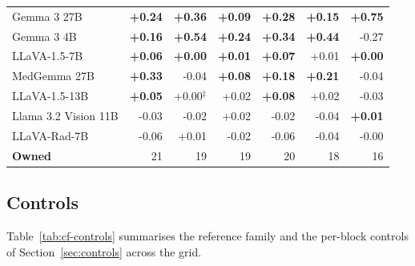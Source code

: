 \documentclass{article}
\begin{document}
\begin{table}[htbp]
{\begin{tabular}{lrrrrrr}
Gemma 3 27B & \cellcolor{cfTerra3}\textbf{+0.24} & \cellcolor{cfTerra4}\textbf{+0.36} & \cellcolor{cfTerra2}\textbf{+0.09} & \cellcolor{cfTerra4}\textbf{+0.28} & \cellcolor{cfTerra3}\textbf{+0.15} & \cellcolor{cfTerra4}\textbf{+0.75} \\
Gemma 3 4B & \cellcolor{cfTerra3}\textbf{+0.16} & \cellcolor{cfTerra4}\textbf{+0.54} & \cellcolor{cfTerra3}\textbf{+0.24} & \cellcolor{cfTerra4}\textbf{+0.34} & \cellcolor{cfTerra4}\textbf{+0.44} & \cellcolor{cfSlate4}-0.27 \\
LLaVA-1.5-7B & \cellcolor{cfTerra2}\textbf{+0.06} & \cellcolor{cfTerra1}\textbf{+0.00} & \cellcolor{cfTerra1}\textbf{+0.01} & \cellcolor{cfTerra2}\textbf{+0.07} & \cellcolor{cfTerra1}+0.01 & \cellcolor{cfTerra1}\textbf{+0.00} \\
MedGemma 27B & \cellcolor{cfTerra4}\textbf{+0.33} & \cellcolor{cfSlate2}-0.04 & \cellcolor{cfTerra2}\textbf{+0.08} & \cellcolor{cfTerra3}\textbf{+0.18} & \cellcolor{cfTerra3}\textbf{+0.21} & \cellcolor{cfSlate2}-0.04 \\
LLaVA-1.5-13B & \cellcolor{cfTerra2}\textbf{+0.05} & \cellcolor{cfTerra1}+0.00$^{\ddagger}$ & \cellcolor{cfTerra1}+0.02 & \cellcolor{cfTerra2}\textbf{+0.08} & \cellcolor{cfTerra1}+0.02 & \cellcolor{cfSlate2}-0.03 \\
Llama 3.2 Vision 11B & \cellcolor{cfSlate2}-0.03 & \cellcolor{cfSlate2}-0.02 & \cellcolor{cfTerra2}+0.02 & \cellcolor{cfSlate1}-0.02 & \cellcolor{cfSlate2}-0.04 & \cellcolor{cfTerra1}\textbf{+0.01} \\
LLaVA-Rad-7B & \cellcolor{cfSlate2}-0.06 & \cellcolor{cfTerra1}+0.01 & \cellcolor{cfSlate2}-0.02 & \cellcolor{cfSlate2}-0.06 & \cellcolor{cfSlate2}-0.04 & \cellcolor{cfSlate1}-0.00 \\
\midrule
\textbf{Owned} & 21 & 19 & 19 & 20 & 18 & 16 \\
\bottomrule
\end{tabular}}
\end{table}

\FloatBarrier

\subsection{Controls}
\label{app:cf-controls-sec}

Table~\ref{tab:cf-controls} summarises the reference family and the per-block controls of Section~\ref{sec:controls} across the grid.
\end{document}
